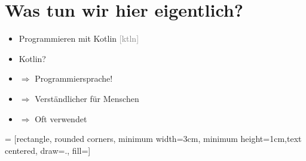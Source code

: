 \section{Was tun wir hier eigentlich?}
\begin{frame}
    \slidehead
    \begin{itemize}
        \item Programmieren mit Kotlin \textcolor{gray}{[\textprimstress k\textopeno t\textscripta l\textsci n]}
            \pause
        \item Kotlin?
            \pause
        \item[] $\Rightarrow$ Programmiersprache!
        \item[] $\Rightarrow$ Verständlicher für Menschen
        \item[] $\Rightarrow$ Oft verwendet
    \end{itemize}

    \pause
    \vspace{0.75cm}

     = [rectangle, rounded corners, minimum width=3cm, minimum height=1cm,text centered, draw=., fill=]
    \centering

\end{frame}

\begin{comment}
    \section{Das erste Programm}
    \subsection{Wie fange ich an?}
    \begin{frame}
        \slidehead
        \begin{itemize}
            \item Befehle bestehen aus Text
            \item Mit einem einfachen Texteditor schreibt man Befehle in eine Datei
            \item Anschließend interpretiert der Computer die Befehle
        \end{itemize}
    \end{frame}
\end{comment}

